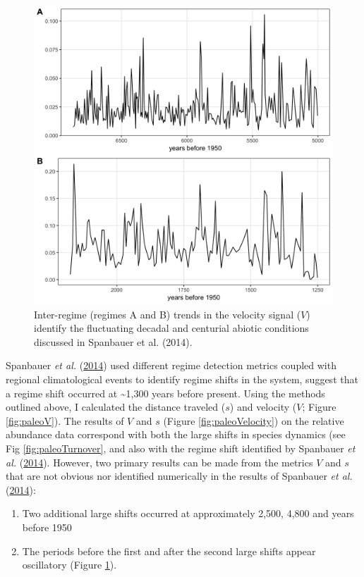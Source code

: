\documentclass[print]{nuthesis}
\begin{document}
\begin{figure}
\includegraphics[width=0.85\linewidth]{./chapterFiles/velocity/figsCalledInDiss/paleoRegime1and3} \caption{Inter-regime (regimes A and B) trends in the velocity signal ($V$) identify  the fluctuating decadal and centurial abiotic conditions discussed in  Spanbauer et al. (2014).}\label{fig:paleoRegime1and3}
\end{figure}
Spanbauer \emph{et al.} (\protect\hyperlink{ref-spanbauer_prolonged_2014}{2014}) used different regime detection metrics coupled with regional climatological events to identify regime shifts in the system, suggest that a regime shift occurred at \textasciitilde1,300 years before present. Using the methods outlined above, I calculated the distance traveled (\(s\)) and velocity (\(V\); Figure \ref{fig:paleoV}). The results of \(V\) and \(s\) (Figure \ref{fig:paleoVelocity}) on the relative abundance data correspond with both the large shifts in species dynamics (see Fig \ref{fig:paleoTurnover}, and also with the regime shift identified by Spanbauer \emph{et al.} (\protect\hyperlink{ref-spanbauer_prolonged_2014}{2014}). However, two primary results can be made from the metrics \(V\) and \(s\) that are not obvious nor identified numerically in the results of Spanbauer \emph{et al.} (\protect\hyperlink{ref-spanbauer_prolonged_2014}{2014}):
\begin{enumerate}
\def\labelenumi{\arabic{enumi}.}
\tightlist
\item
  Two additional large shifts occurred at approximately 2,500, 4,800 and years before 1950\\
\item
  The periods before the first and after the second large shifts appear oscillatory (Figure \ref{fig:paleoRegime1and3}).
\end{enumerate}
\end{document}
